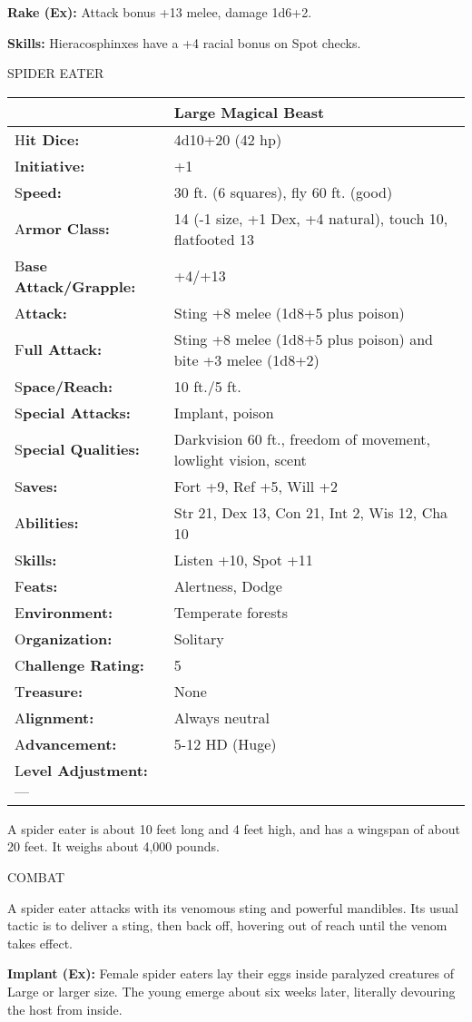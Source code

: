 \documentclass{article}
\begin{document}
\textbf{Rake (Ex):} Attack bonus +13 melee, damage 1d6+2.

\textbf{Skills:} Hieracosphinxes have a +4 racial bonus on Spot checks.

\vspace{12pt}
{\LARGE{}SPIDER EATER}

\begin{tabular}{|>{\raggedright}p{87pt}|>{\raggedright}p{238pt}|}
\hline
  & Large Magical Beast\tabularnewline
\hline
H\textbf{it Dice:} & 4d10+20 (42 hp)\tabularnewline
\hline
I\textbf{nitiative:} & +1\tabularnewline
\hline
S\textbf{peed:} & 30 ft. (6 squares), fly 60 ft. (good)\tabularnewline
\hline
A\textbf{rmor Class:} & 14 (-1 size, +1 Dex, +4 natural), touch 10, flatfooted 
13\tabularnewline
\hline
B\textbf{ase Attack/Grapple:} & +4/+13\tabularnewline
\hline
A\textbf{ttack:} & Sting +8 melee (1d8+5 plus poison)\tabularnewline
\hline
F\textbf{ull Attack:} & Sting +8 melee (1d8+5 plus poison) and bite +3 melee (1d8+2)\tabularnewline
\hline
S\textbf{pace/Reach:} & 10 ft./5 ft.\tabularnewline
\hline
S\textbf{pecial Attacks:} & Implant, poison\tabularnewline
\hline
S\textbf{pecial Qualities:} & Darkvision 60 ft., freedom of movement, lowlight 
vision, scent\tabularnewline
\hline
S\textbf{aves:} & Fort +9, Ref +5, Will +2\tabularnewline
\hline
A\textbf{bilities:} & Str 21, Dex 13, Con 21, Int 2, Wis 12, Cha 10\tabularnewline
\hline
S\textbf{kills:} & Listen +10, Spot +11\tabularnewline
\hline
F\textbf{eats:} & Alertness, Dodge\tabularnewline
\hline
E\textbf{nvironment:} & Temperate forests\tabularnewline
\hline
O\textbf{rganization:} & Solitary\tabularnewline
\hline
C\textbf{hallenge Rating:} & 5\tabularnewline
\hline
T\textbf{reasure:} & None\tabularnewline
\hline
A\textbf{lignment:} & Always neutral\tabularnewline
\hline
A\textbf{dvancement:} & 5-12 HD (Huge)\tabularnewline
\hline
L\textbf{evel Adjustment:}--- & \tabularnewline
\hline
\end{tabular}

A spider eater is about 10 feet long and 4 feet high, and has a wingspan of about 
20 feet. It weighs about 4,000 pounds.

COMBAT

A spider eater attacks with its venomous sting and powerful mandibles. Its usual 
tactic is to deliver a sting, then back off, hovering out of reach until the venom 
takes effect.

\textbf{Implant (Ex): }Female spider eaters lay their eggs inside paralyzed creatures 
of Large or larger size. The young emerge about six weeks later, literally devouring 
the host from inside.
\end{document}
